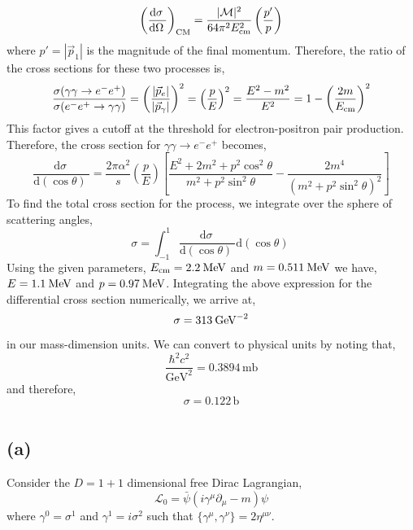 \documentclass[12pt]{article}
\renewcommand{\d}[1]{ \mathrm{d}#1 \:}
\newcommand{\deriv}[2]{\frac{\d{#1}}{\d{#2}}}
\newcommand{\lagrange}{\mathcal{L}}
\begin{document}
\[
\left( \deriv{\sigma}{\Omega} \right)_{\mathrm{CM}} = \frac{|\mathcal{M}|^2}{64 \pi^2 \Ecm^2} \left( \frac{p'}{p} \right)
\]
where $p' = |\vec{p}_1|$ is the magnitude of the final momentum. 
Therefore, the ratio of the cross sections for these two processes is,
\[ \frac{\sigma(\gamma \gamma \to e^{-} e^{+})}{\sigma(e^{-} e^{+} \to \gamma \gamma)} = \left( \frac{|\vec{p}_e|}{|\vec{p}_\gamma|} \right)^2 = \left( \frac{p}{E} \right)^2 = \frac{E^2 - m^2}{E^2} = 1 - \left( \frac{2m}{E_{\mathrm{cm}}} \right)^2 \]
This factor gives a cutoff at the threshold for electron-positron pair production. Therefore, the cross section for $\gamma \gamma \to e^{-} e^{+}$ becomes,
\[ \deriv{\sigma}{(\cos{\theta})} = \frac{2 \pi \alpha^2}{s} \left( \frac{p}{E} \right) \left[ \frac{E^2 + 2m^2 + p^2 \cos^2{\theta}}{m^2 + p^2 \sin^2{\theta}} - \frac{2m^4}{(m^2 + p^2 \sin^2{\theta})^2} \right] \]
To find the total cross section for the process, we integrate over the sphere of scattering angles,
\[ 
\sigma = \int_{-1}^{1} \deriv{\sigma}{(\cos{\theta})} \d{(\cos{\theta})} 
\]
Using the given parameters, $E_{\mathrm{cm}} = 2.2 \: \mathrm{MeV}$ and $m = 0.511 \: \mathrm{MeV}$ we have, $E = 1.1 \: \mathrm{MeV}$ and $p = 0.97 \: \mathrm{MeV}$. Integrating the above expression for the differential cross section numerically, we arrive at,
\[ \sigma = 313 \: \mathrm{GeV}^{-2} \]
in our mass-dimension units. We can convert to physical units by noting that,
\[ \frac{\hbar^2 c^2}{\mathrm{GeV}^2} = 0.3894 \, \mathrm{mb} \]
and therefore, 
\[ \sigma =  0.122 \, \mathrm{b} \]
\section{}

\subsection{(a)}

Consider the $D = 1 + 1$ dimensional free Dirac Lagrangian,
\[ \lagrange_0 = \bar{\psi} ( i \gamma^\mu \partial_\mu - m) \psi \]
where $\gamma^0 = \sigma^1$ and $\gamma^1 = i \sigma^2$ such that $\{ \gamma^\mu, \gamma^\nu \} = 2 \eta^{\mu \nu}$. 
\bigskip\\
\end{document}
